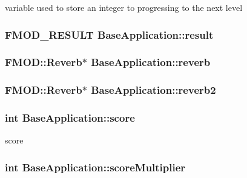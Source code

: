 variable used to store an integer to progressing to the next level \hypertarget{class_base_application_ad50a268c7b77ee4e910eca0d96430705}{
\subsubsection[{result}]{\setlength{\rightskip}{0pt plus 5cm}F\-M\-O\-D\-\_\-\-R\-E\-S\-U\-L\-T Base\-Application\-::result\hspace{0.3cm}{\ttfamily [protected]}}}\label{class_base_application_ad50a268c7b77ee4e910eca0d96430705}
\hypertarget{class_base_application_a92820c32798f0d3928fcce24787eda1f}{
\subsubsection[{reverb}]{\setlength{\rightskip}{0pt plus 5cm}F\-M\-O\-D\-::\-Reverb$\ast$ Base\-Application\-::reverb\hspace{0.3cm}{\ttfamily [protected]}}}\label{class_base_application_a92820c32798f0d3928fcce24787eda1f}
\hypertarget{class_base_application_a1b0ab0994f1beef254a3020b5b2a0945}{
\subsubsection[{reverb2}]{\setlength{\rightskip}{0pt plus 5cm}F\-M\-O\-D\-::\-Reverb$\ast$ Base\-Application\-::reverb2\hspace{0.3cm}{\ttfamily [protected]}}}\label{class_base_application_a1b0ab0994f1beef254a3020b5b2a0945}
\hypertarget{class_base_application_a681cfe91d2cee55f8d783651a074fdcf}{
\subsubsection[{score}]{\setlength{\rightskip}{0pt plus 5cm}int Base\-Application\-::score\hspace{0.3cm}{\ttfamily [protected]}}}\label{class_base_application_a681cfe91d2cee55f8d783651a074fdcf}
score \hypertarget{class_base_application_a4484039f7dfe0e4eaa962a4fa781bc88}{
\subsubsection[{score\-Multiplier}]{\setlength{\rightskip}{0pt plus 5cm}int Base\-Application\-::score\-Multiplier\hspace{0.3cm}{\ttfamily [protected]}}}\label{class_base_application_a4484039f7dfe0e4eaa962a4fa781bc88}
